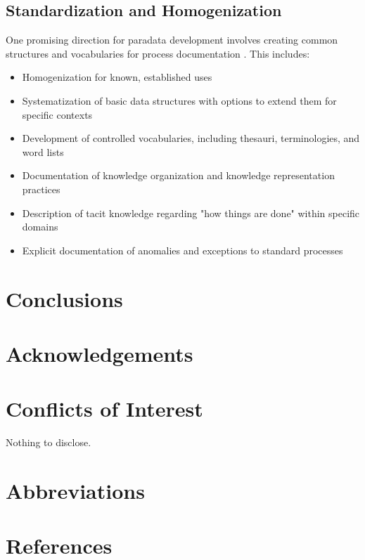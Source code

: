 \subsection{Standardization and Homogenization}
One promising direction for paradata development involves creating common structures and vocabularies for process documentation \cite{huvila_perspectives_2024}. This includes:

\begin{itemize}
    \item Homogenization for known, established uses
    \item Systematization of basic data structures with options to extend them for specific contexts
    \item Development of controlled vocabularies, including thesauri, terminologies, and word lists
    \item Documentation of knowledge organization and knowledge representation practices
    \item Description of tacit knowledge regarding "how things are done" within specific domains
    \item Explicit documentation of anomalies and exceptions to standard processes
\end{itemize}

\section{Conclusions}


\section{Acknowledgements}  %



\section{Conflicts of Interest}
Nothing to disclose.

\section{Abbreviations}  %


\section{References}


